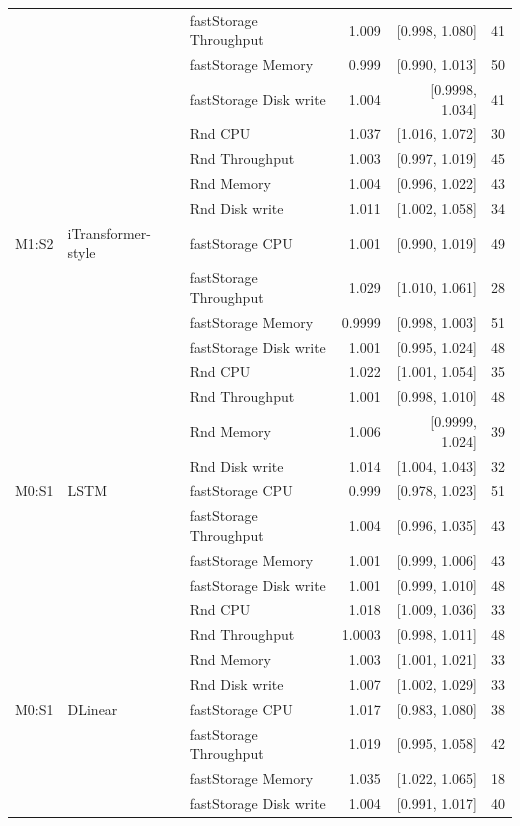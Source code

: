 \begin{longtable}{@{}lllrrr@{}}
 &  & fastStorage Throughput & 1.009 & [0.998, 1.080] & 41 \\
 &  & fastStorage Memory & 0.999 & [0.990, 1.013] & 50 \\
 &  & fastStorage Disk write & 1.004 & [0.9998, 1.034] & 41 \\
 &  & Rnd CPU & 1.037 & [1.016, 1.072] & 30 \\
 &  & Rnd Throughput & 1.003 & [0.997, 1.019] & 45 \\
 &  & Rnd Memory & 1.004 & [0.996, 1.022] & 43 \\
 &  & Rnd Disk write & 1.011 & [1.002, 1.058] & 34 \\
\addlinespace
M1:S2 & iTransformer-style & fastStorage CPU & 1.001 & [0.990, 1.019] & 49 \\
 &  & fastStorage Throughput & 1.029 & [1.010, 1.061] & 28 \\
 &  & fastStorage Memory & 0.9999 & [0.998, 1.003] & 51 \\
 &  & fastStorage Disk write & 1.001 & [0.995, 1.024] & 48 \\
 &  & Rnd CPU & 1.022 & [1.001, 1.054] & 35 \\
 &  & Rnd Throughput & 1.001 & [0.998, 1.010] & 48 \\
 &  & Rnd Memory & 1.006 & [0.9999, 1.024] & 39 \\
 &  & Rnd Disk write & 1.014 & [1.004, 1.043] & 32 \\
\addlinespace
M0:S1 & LSTM & fastStorage CPU & 0.999 & [0.978, 1.023] & 51 \\
 &  & fastStorage Throughput & 1.004 & [0.996, 1.035] & 43 \\
 &  & fastStorage Memory & 1.001 & [0.999, 1.006] & 43 \\
 &  & fastStorage Disk write & 1.001 & [0.999, 1.010] & 48 \\
 &  & Rnd CPU & 1.018 & [1.009, 1.036] & 33 \\
 &  & Rnd Throughput & 1.0003 & [0.998, 1.011] & 48 \\
 &  & Rnd Memory & 1.003 & [1.001, 1.021] & 33 \\
 &  & Rnd Disk write & 1.007 & [1.002, 1.029] & 33 \\
\addlinespace
M0:S1 & DLinear & fastStorage CPU & 1.017 & [0.983, 1.080] & 38 \\
 &  & fastStorage Throughput & 1.019 & [0.995, 1.058] & 42 \\
 &  & fastStorage Memory & 1.035 & [1.022, 1.065] & 18 \\
 &  & fastStorage Disk write & 1.004 & [0.991, 1.017] & 40 \\

\end{longtable}
